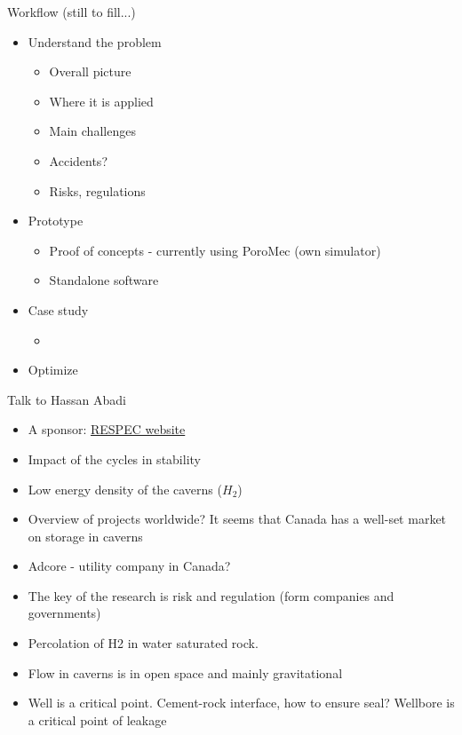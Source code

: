 \begin{frame}{Workflow (still to fill...)}
\begin{itemize}
\item Understand the problem
	\begin{itemize}
		\item Overall picture
		\item Where it is applied
		\item Main challenges
		\item Accidents?
		\item Risks, regulations
    \end{itemize}
\item Prototype
	\begin{itemize}
		\item Proof of concepts - currently using PoroMec (own simulator)
		\item Standalone software
	\end{itemize}
\item Case study
	\begin{itemize}
		\item 
	\end{itemize}
\item Optimize
\end{itemize}
\end{frame}

\begin{frame}[shrink=20,fragile]{Talk to Hassan Abadi}
\begin{itemize}
\item A sponsor: \href{https://www.respec.com/market/energy/caverns-hydrogen-underground-storage/}{RESPEC website}
\item Impact of the cycles in stability
\item Low energy density of the caverns ($H_2$)
\item Overview of projects worldwide? It seems that Canada has a well-set market on storage in caverns
\item Adcore - utility company in Canada?
\item The key of the research is risk and regulation (form companies and governments)
\item Percolation of H2 in water saturated rock.
\item Flow in caverns is in open space and mainly gravitational
\item Well is a critical point. Cement-rock interface, how to ensure seal? Wellbore is a critical point of leakage
\end{itemize}
\end{frame}

